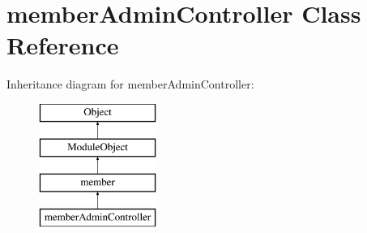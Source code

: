 \hypertarget{classmemberAdminController}{\section{member\+Admin\+Controller Class Reference}
\label{classmemberAdminController}
}
Inheritance diagram for member\+Admin\+Controller\+:\begin{figure}[H]
\begin{center}
\leavevmode
\includegraphics[height=4.000000cm]{classmemberAdminController}
\end{center}
\end{figure}
